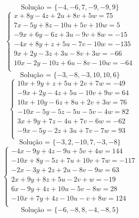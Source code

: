 \documentclass[12pt,oneside,a4paper]{article}
\begin{document}
\begin{equation*}
\text{Solução = }\{-4,-6,7,-9,-9,9\}
\end{equation*}
\vspace{\baselineskip}
\begin{equation*}
\begin{cases}
x+8y-4z+2u+8v+5w=75 \\
7x-5y+8z-10u+5v+10w=5 \\
-9x+6y-6z+3u-9v+8w=-15 \\
-4x+8y+z+5u-7v-10w=-135 \\
9x+2y-3z+3u-8v+3w=-66 \\
10x-2y-10z+6u-8v-10w=-64 \\
\end{cases}
\end{equation*}
\begin{equation*}
\text{Solução = }\{-3,-8,-3,10,10,6\}
\end{equation*}
\vspace{\baselineskip}
\begin{equation*}
\begin{cases}
10x+9y+z+5u+2v+7w=-49 \\
-9x+2y-4z+5u-10v+9w=64 \\
10x+10y-6z+8u+2v+3w=76 \\
-10x-5y-5z-5u-5v-4w=82 \\
3x+9y+7z-4u+7v-6w=-62 \\
-9x-5y-2z+3u+7v-7w=93 \\
\end{cases}
\end{equation*}
\begin{equation*}
\text{Solução = }\{-3,2,-10,7,-3,-8\}
\end{equation*}
\vspace{\baselineskip}
\begin{equation*}
\begin{cases}
-4x-9y+4z-9u+5v+4w=144 \\
-10x+8y-5z+7u+10v+7w=-117 \\
-2x-3y+2z+2u-8v-9w=63 \\
2x+9y+8z+5u-2v+w=-19 \\
6x-9y+4z+10u-5v-8w=28 \\
-10x+7y+4z-10u-v+8w=124 \\
\end{cases}
\end{equation*}
\begin{equation*}
\text{Solução = }\{-6,-8,8,-4,-8,5\}
\end{equation*}
\end{document}
